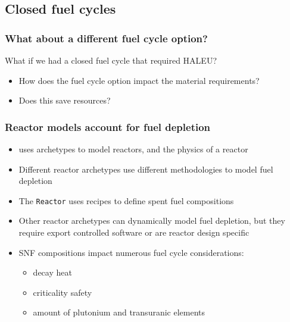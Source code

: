 \subsection{Closed fuel cycles}
\begin{frame}
    \frametitle{What about a different fuel cycle option?}
    What if we had a closed fuel cycle that required \gls{HALEU}?
    \begin{itemize}
        \item How does the fuel cycle option impact the material requirements?
        \item Does this save resources?
    \end{itemize}

\end{frame}

\begin{frame}
    \frametitle{Reactor models account for fuel depletion}
    \begin{itemize}
    \item \Cyclus uses archetypes to model reactors, and the physics 
        of a reactor
    \item Different reactor archetypes use different methodologies 
        to model fuel depletion
   \item<2-> The \Cycamore \texttt{Reactor} uses recipes to define spent fuel compositions
   \item<2-> Other \Cyclus reactor archetypes can dynamically model 
         fuel depletion, but they require export controlled software 
         or are reactor design specific
    \item<3-> \Gls{SNF} compositions impact numerous fuel cycle considerations:
    \begin{itemize}
        \item<3-> decay heat
        \item<3-> criticality safety
        \item<3-> amount of plutonium and transuranic elements
    \end{itemize}


\end{itemize}
\end{frame}

